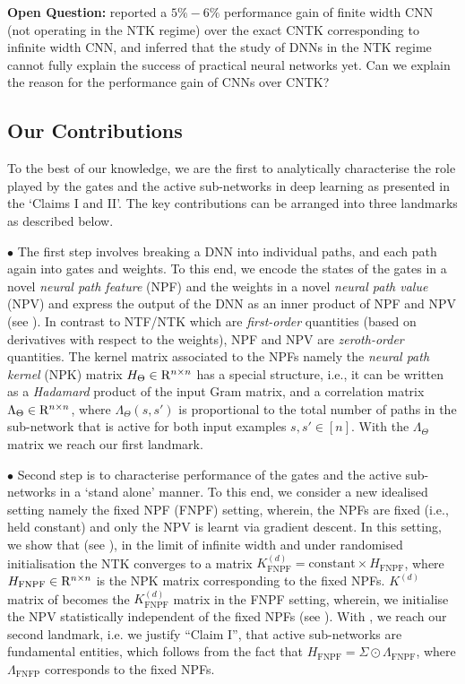 \documentclass{article}
\begin{document}
\textbf{Open Question:} \cite{arora2019exact} reported a $5\% - 6\%$ performance gain of finite width CNN (not operating in the NTK regime) over the exact CNTK corresponding to infinite width CNN, and inferred that the study of DNNs in the NTK regime cannot fully explain the success of practical neural networks yet. Can we explain the reason for the performance gain of CNNs over CNTK?

\subsection{Our Contributions}\label{sec:contrib}
To the best of our knowledge, we are the first to analytically characterise the role played by the gates and the active sub-networks in deep learning as presented in the `Claims I and II'.  The key contributions can be arranged into three landmarks as described below.

$\bullet$ The first step involves breaking a DNN into individual paths, and each path again into gates and weights.  To this end, we encode the states of the gates in a novel \emph{neural path feature} (NPF) and the weights in a novel \emph{neural path value} (NPV) and express the output of the DNN as an inner product of NPF and NPV (see ). In contrast to NTF/NTK which are \emph{first-order} quantities (based on derivatives with respect to the weights), NPF and NPV are \emph{zeroth-order} quantities. The kernel matrix associated to the NPFs namely the \emph{neural path kernel} (NPK) matrix $H_{\Theta}\in\mathrm{R}^{n\times n}$ has a special structure, i.e., it can be written as a \emph{Hadamard} product of the input Gram matrix, and a correlation matrix $\Lambda_{\Theta}\in\mathrm{R}^{n\times n}$, where $\Lambda_{\Theta}(s,s')$ is proportional to the total number of paths in the sub-network that is active for both input examples $s,s'\in[n]$. With the $\Lambda_{\Theta}$ matrix we reach our first landmark.

$\bullet$  Second step is to characterise performance of the gates and the active sub-networks in a `stand alone' manner. To this end, we consider a new idealised setting namely the fixed NPF (FNPF) setting, wherein, the NPFs are fixed (i.e., held constant) and only the NPV is learnt via gradient descent. In this setting, we show that (see ), in the limit of infinite width and under randomised initialisation the NTK converges to a matrix $K^{(d)}_{\text{FNPF}}=\text{constant} \times H_{\text{FNPF}}$, where $H_{\text{FNPF}}\in\mathrm{R}^{n\times n}$ is the NPK matrix corresponding to the fixed NPFs. $K^{(d)}$ matrix of \cite{ntk,arora2019exact,cao2019generalization} becomes the $K^{(d)}_{\text{FNPF}}$ matrix in the FNPF setting,  wherein, we initialise the NPV statistically independent of the fixed NPFs (see ). With , we reach our second landmark, i.e. we justify ``Claim I'', that active sub-networks are fundamental entities, which follows from the fact that $H_{\text{FNPF}}=\Sigma\odot \Lambda_{\text{FNPF}}$, where $\Lambda_{\text{FNFP}}$ corresponds to the fixed NPFs.
\end{document}
